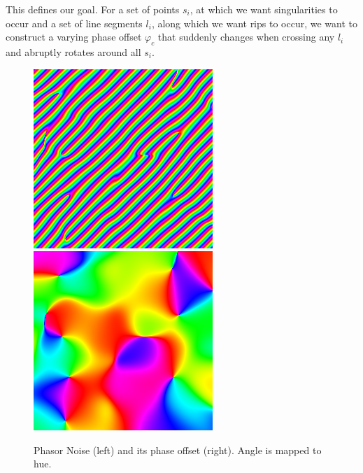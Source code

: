 \documentclass{utue} %
\begin{document}
This defines our goal. For a set of points $s_i$, at which we want singularities to occur and a set of line segments $l_i$, along which we want rips to occur, we want to construct a varying phase offset $\varphi_c$ that suddenly changes when crossing any $l_i$ and abruptly rotates around all $s_i$.

\begin{figure}[h]
  \centering
  \includegraphics[width=0.45\linewidth]{images/phasorNoise}
  \includegraphics[width=0.45\linewidth]{images/phasorPhase}
  \caption{Phasor Noise (left) and its phase offset (right). Angle is mapped to hue.}\label{fig:phasorNoisePhase}
\end{figure}

\printbibliography
\end{document}
